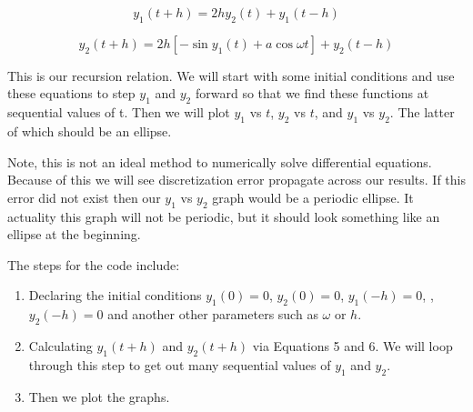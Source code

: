 \documentclass[11pt]{amsart}
\begin{document}
\begin{equation}
y_1(t+h) = 2h y_2(t) + y_1(t-h)
\end{equation}

\begin{equation}
y_2(t+h) = 2h \left[- \sin{y_1(t)}+a \cos{\omega t} \right] + y_2(t-h)
\end{equation}
\vspace{2 mm}

This is our recursion relation.  We will start with some initial conditions and use these equations to step $y_1$ and $y_2$ forward so that we find these functions at sequential values of t.  Then we will plot $y_1$ vs $t$, $y_2$ vs $t$, and $y_1$ vs $y_2$.  The latter of which should be an ellipse.
\newline

Note, this is not an ideal method to numerically solve differential equations.  Because of this we will see discretization error propagate across our results.  If this error did not exist then our $y_1$ vs $y_2$ graph would be a periodic ellipse.  It actuality this graph will not be periodic, but it should look something like an ellipse at the beginning.
\newline

The steps for the code include:
\begin{enumerate}
\item  Declaring the initial conditions $y_1(0)=0$, $y_2(0)=0$, $y_1(-h)=0$, ,$y_2(-h)=0$ and another other parameters such as $\omega$ or $h$.
\item Calculating $y_1(t+h)$ and $y_2(t+h)$ via Equations 5 and 6.  We will loop through this step to get out many sequential values of $y_1$ and $y_2$.
\item Then we plot the graphs.
\end{enumerate}
\end{document}
